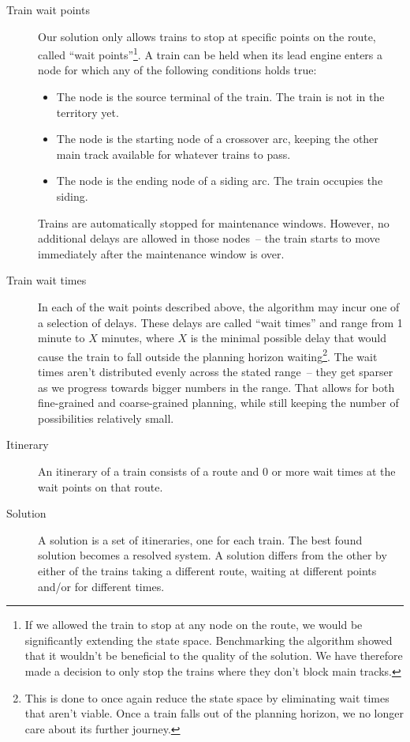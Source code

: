 \documentclass[10pt,a4paper,final]{article}
\begin{document}
\begin{description}
\item[Train wait points] Our solution only allows trains to stop at specific points on the route, called ``wait points''\footnote{If we allowed the train to stop at any node on the route, we would be significantly extending the state space. Benchmarking the algorithm showed that it wouldn't be beneficial to the quality of the solution. We have therefore made a decision to only stop the trains where they don't block main tracks.}. A train can be held when its lead engine enters a node for which any of the following conditions holds true:

\begin{itemize}
\item The node is the source terminal of the train. The train is not in the territory yet.
\item The node is the starting node of a crossover arc, keeping the other main track available for whatever trains to pass.
\item The node is the ending node of a siding arc. The train occupies the siding.
\end{itemize}

Trains are automatically stopped for maintenance windows. However, no additional delays are allowed in those nodes~-- the train starts to move immediately after the maintenance window is over.

\item[Train wait times] In each of the wait points described above, the algorithm may incur one of a selection of delays. These delays are called ``wait times'' and range from 1 minute to $X$ minutes, where $X$ is the minimal possible delay that would cause the train to fall outside the planning horizon waiting\footnote{This is done to once again reduce the state space by eliminating wait times that aren't viable. Once a train falls out of the planning horizon, we no longer care about its further journey.}. The wait times aren't distributed evenly across the stated range~-- they get sparser as we progress towards bigger numbers in the range. That allows for both fine-grained and coarse-grained planning, while still keeping the number of possibilities relatively small.

\item[Itinerary] An itinerary of a train consists of a route and 0 or more wait times at the wait points on that route.

\item[Solution] A solution is a set of itineraries, one for each train. The best found solution becomes a resolved system. A solution differs from the other by either of the trains taking a different route, waiting at different points and/or for different times.

\end{description}
\end{document}
